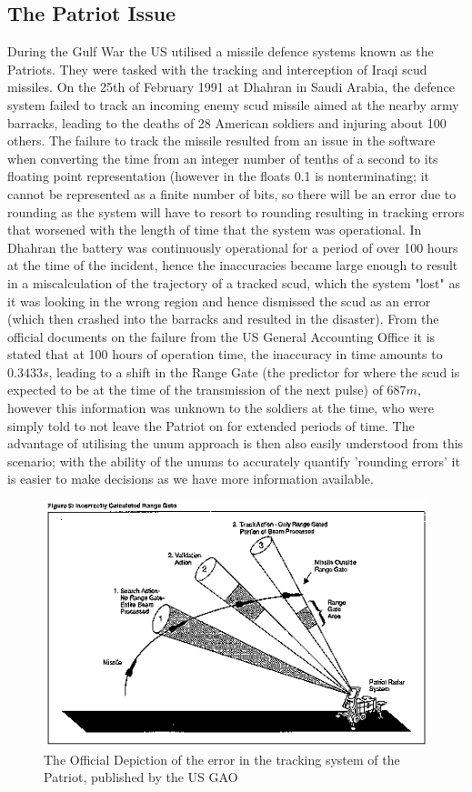 \documentclass[twocolumn]{IEEEtran}
\begin{document}
\subsection{The Patriot Issue}
During the Gulf War the US utilised a missile defence systems known as the Patriots. They were tasked with the tracking and interception of Iraqi scud missiles. On the 25th of February 1991 at Dhahran in Saudi Arabia, the defence system failed to track an incoming enemy scud missile aimed at the nearby army barracks, leading to the deaths of 28 American soldiers and injuring about 100 others. The failure to track the missile resulted from an issue in the software when converting the time from an integer number of tenths of a second to its floating point representation (however in the floats 0.1 is nonterminating; it cannot be represented as a finite number of bits, so there will be an error due to rounding as the system will have to resort to rounding resulting in tracking errors that worsened with the length of time that the system was operational. In Dhahran the battery was continuously operational for a period of over 100 hours at the time of the incident, hence the inaccuracies became large enough to result in a miscalculation of the trajectory of a tracked scud, which the system "lost" as it was looking in the wrong region and hence dismissed the scud as an error (which then crashed into the barracks and resulted in the disaster). From the official documents on the failure from the US General Accounting Office it is stated that at 100 hours of operation time, the inaccuracy in time amounts to $0.3433s$, leading to a shift in the Range Gate (the predictor for where the scud is expected to be at the time of the transmission of the next pulse) of $687m$, however this information was unknown to the soldiers at the time, who were simply told to not leave the Patriot on for extended periods of time. The advantage of utilising the unum approach is then also easily understood from this scenario; with the ability of the unums to accurately quantify 'rounding errors' it is easier to make decisions as we have more information available. 

\begin{figure}[h]

\begin{center}

\includegraphics[scale=0.7]{missile}
\caption{The Official Depiction of the error in the tracking system of the Patriot, published by the US GAO}

\end{center}

\end{figure}
\end{document}
